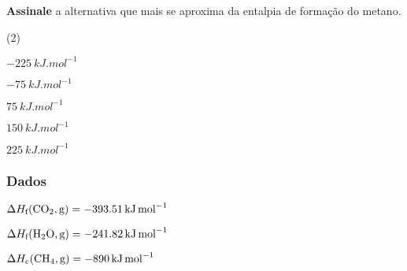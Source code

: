 \documentclass[braun, twocolumn]{braun}
\begin{document}
\begin{problem}
[2A17]\textbf{Assinale} a alternativa que mais se aproxima da entalpia de
formação do metano.


\begin{choices}
(2)
\item \(\qty{-225}{kJ.mol^{-1}}\)

\item \(\qty{-75}{kJ.mol^{-1}}\)

\item \(\qty{75}{kJ.mol^{-1}}\)

\item \(\qty{150}{kJ.mol^{-1}}\)

\item \(\qty{225}{kJ.mol^{-1}}\)

\end{choices}
\subsubsection*{Dados}


\begin{datalist}

\item $\Delta H_\text{f}(\ce{CO2, {g}}) = \qty{-393,51}{kJ.mol^{-1}}$
\item $\Delta H_\text{f}(\ce{H2O, {g}}) = \qty{-241,82}{kJ.mol^{-1}}$
\item $\Delta H_\text{c}(\ce{CH4, {g}}) = \qty{-890}{kJ.mol^{-1}}$
\end{datalist}

\end{problem}
\end{document}
